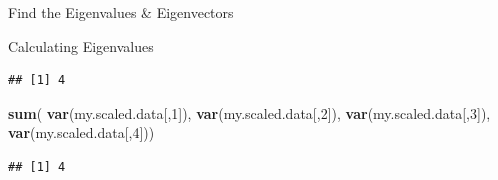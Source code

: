 \documentclass[ignorenonframetext,]{beamer}
\newenvironment{Shaded}{\begin{snugshade}}{\end{snugshade}}
\newcommand{\DecValTok}[1]{\textcolor[rgb]{0.00,0.00,0.81}{#1}}
\newcommand{\KeywordTok}[1]{\textcolor[rgb]{0.13,0.29,0.53}{\textbf{#1}}}
\newcommand{\NormalTok}[1]{#1}
\begin{document}
\begin{frame}[fragile]{Find the Eigenvalues \& Eigenvectors}
\begin{block}{Calculating Eigenvalues}
\begin{verbatim}
## [1] 4
\end{verbatim}

\begin{Shaded}
\begin{Highlighting}[]
\KeywordTok{sum}\NormalTok{(}
  \KeywordTok{var}\NormalTok{(my.scaled.data[,}\DecValTok{1}\NormalTok{]),}
  \KeywordTok{var}\NormalTok{(my.scaled.data[,}\DecValTok{2}\NormalTok{]),}
  \KeywordTok{var}\NormalTok{(my.scaled.data[,}\DecValTok{3}\NormalTok{]),}
  \KeywordTok{var}\NormalTok{(my.scaled.data[,}\DecValTok{4}\NormalTok{]))}
\end{Highlighting}
\end{Shaded}

\begin{verbatim}
## [1] 4
\end{verbatim}

\end{block}

\end{frame}
\end{document}
